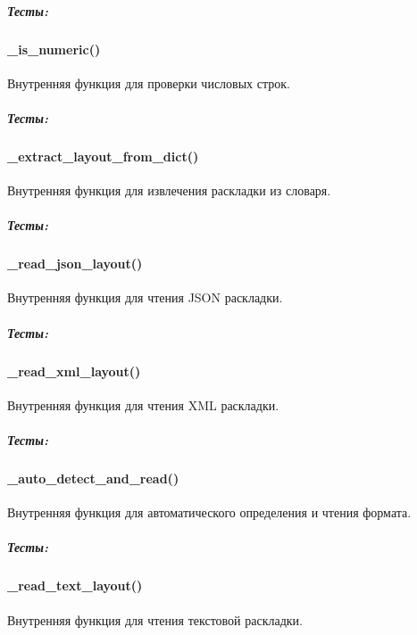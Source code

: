 \documentclass[a4paper,11pt,russian,openany,oneside]{sphinxmanual}
\begin{document}
\subparagraph{Тесты:}
\label{\detokenize{tests_module:id25}}

\paragraph{\_is\_numeric()}
\label{\detokenize{tests_module:is-numeric}}
\sphinxAtStartPar
Внутренняя функция для проверки числовых строк.


\subparagraph{Тесты:}
\label{\detokenize{tests_module:id26}}

\paragraph{\_extract\_layout\_from\_dict()}
\label{\detokenize{tests_module:extract-layout-from-dict}}
\sphinxAtStartPar
Внутренняя функция для извлечения раскладки из словаря.


\subparagraph{Тесты:}
\label{\detokenize{tests_module:id27}}

\paragraph{\_read\_json\_layout()}
\label{\detokenize{tests_module:read-json-layout}}
\sphinxAtStartPar
Внутренняя функция для чтения JSON раскладки.


\subparagraph{Тесты:}
\label{\detokenize{tests_module:id28}}

\paragraph{\_read\_xml\_layout()}
\label{\detokenize{tests_module:read-xml-layout}}
\sphinxAtStartPar
Внутренняя функция для чтения XML раскладки.


\subparagraph{Тесты:}
\label{\detokenize{tests_module:id29}}

\paragraph{\_auto\_detect\_and\_read()}
\label{\detokenize{tests_module:auto-detect-and-read}}
\sphinxAtStartPar
Внутренняя функция для автоматического определения и чтения формата.


\subparagraph{Тесты:}
\label{\detokenize{tests_module:id30}}

\paragraph{\_read\_text\_layout()}
\label{\detokenize{tests_module:read-text-layout}}
\sphinxAtStartPar
Внутренняя функция для чтения текстовой раскладки.
\end{document}
